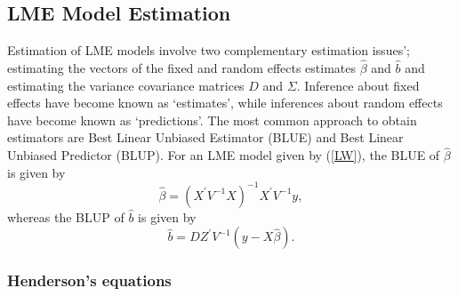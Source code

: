 \documentclass[12pt, a4paper]{report}
\theoremstyle{plain}
\theoremstyle{definition}
\theoremstyle{remark}
\begin{document}
			
			
			
			\subsection{LME Model Estimation}
			Estimation of LME models involve two complementary estimation issues'; estimating the vectors of the fixed and random effects estimates $\hat{\beta}$ and $\hat{b}$ and estimating the variance covariance matrices $D$ and $\Sigma$.
			Inference about fixed effects have become known as `estimates', while inferences about random effects have become known as `predictions'. The most common approach to obtain estimators are Best Linear Unbiased Estimator (BLUE) and Best Linear Unbiased Predictor (BLUP). For an LME model given by (\ref{LW}), the BLUE of $\hat{\beta}$ is given by
			\[\hat{\beta} = (X^\prime V^{-1}X)^{-1}X^\prime V^{-1}y,\]whereas the BLUP of $\hat{b}$ is given by
			\[\hat{b} = DZ^{\prime} V^{-1} (y-X\hat{\beta}).\]
			
			\subsubsection{Henderson's equations}
\end{document}

